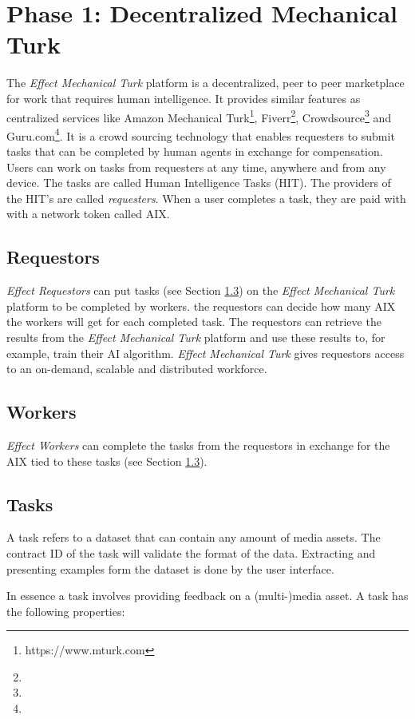 \documentclass{article}
\begin{document}
\section{Phase 1: Decentralized Mechanical Turk}
\label{sec:phase1}
The \emph{Effect Mechanical Turk} platform is a decentralized, peer to
peer marketplace for work that requires human intelligence.  It
provides similar features as centralized services like Amazon
Mechanical Turk\footnote{https://www.mturk.com}, Fiverr\footnote{}, Crowdsource\footnote{}
and Guru.com\footnote{}. It is a crowd sourcing technology that
enables requesters to submit tasks that can be completed by human
agents in exchange for compensation. Users can work on tasks from
requesters at any time, anywhere and from any device. The tasks are
called Human Intelligence Tasks (HIT). The providers of
the HIT’s are called \emph{requesters}. When a user completes a task,
they are paid with with a network token called AIX.

\subsection{Requestors}
\emph{Effect Requestors} can put tasks (see Section \ref{subsec:tasks}) on the \emph{Effect Mechanical Turk} platform to be completed by workers. the requestors can decide how many AIX the workers will get for each completed task. The requestors can retrieve the results from the \emph{Effect Mechanical Turk} platform and use these results to, for example, train their AI algorithm. \emph{Effect Mechanical Turk} gives requestors access to an on-demand, scalable and distributed workforce.

\subsection{Workers}
\emph{Effect Workers} can complete the tasks from the requestors in exchange for the AIX tied to these tasks (see Section \ref{subsec:tasks}).


\subsection{Tasks}
\label{subsec:tasks}
A task refers to a dataset that can contain any amount of media
assets. The contract ID of the task will validate the format of the
data. Extracting and presenting examples form the dataset is done by
the user interface.

In essence a task involves providing feedback on a (multi-)media
asset. A task has the following properties:
\end{document}
